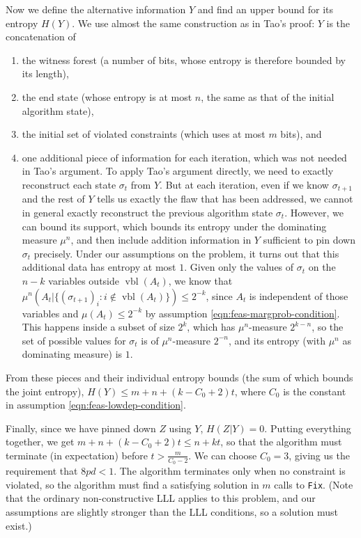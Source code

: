\documentclass[twocolumn]{article}
\begin{document}
Now we define the alternative information $Y$ and find an upper bound for its entropy $H(Y)$.  We use almost the same construction as in Tao's proof: $Y$ is the concatenation of
\begin{enumerate}
  \item the witness forest (a number of bits, whose entropy is therefore bounded by its length),
  \item the end state (whose entropy is at most $n$, the same as that of the initial algorithm state),
  \item the initial set of violated constraints (which uses at most $m$ bits), and
  \item one additional piece of information for each iteration, which was not needed in Tao's argument.  To apply Tao's argument directly, we need to exactly reconstruct each state $\sigma_t$ from $Y$.  But at each iteration, even if we know $\sigma_{t+1}$ and the rest of $Y$ tells us exactly the flaw that has been addressed, we cannot in general exactly reconstruct the previous algorithm state $\sigma_t$.  However, we can bound its support, which bounds its entropy under the dominating measure $\mu^n$, and then include addition information in $Y$ sufficient to pin down $\sigma_t$ precisely.  Under our assumptions on the problem, it turns out that this additional data has entropy at most $1$.  Given only the values of $\sigma_t$ on the $n - k$ variables outside $\operatorname{vbl}(A_t)$, we know that $\mu^n(A_t | \{(\sigma_{t+1})_i: i \notin \operatorname{vbl}(A_t)\}) \leq 2^{-k}$, since $A_t$ is independent of those variables and $\mu(A_t) \leq 2^{-k}$ by assumption \ref{eqn:feas-margprob-condition}.  This happens inside a subset of size $2^{k}$, which has $\mu^n$-measure $2^{k-n}$, so the set of possible values for $\sigma_t$ is of $\mu^n$-measure $2^{-n}$, and its entropy (with $\mu^n$ as dominating measure) is $1$. %
\end{enumerate}

From these pieces and their individual entropy bounds (the sum of which bounds the joint entropy), $H(Y) \leq m + n + (k - C_0 + 2) t$, where $C_0$ is the constant in assumption \ref{eqn:feas-lowdep-condition}.

Finally, since we have pinned down $Z$ using $Y$, $H(Z | Y) = 0$.  Putting everything together, we get $m + n + (k - C_0 + 2) t \leq n + k t$, so that the algorithm must terminate (in expectation) before $t > \frac{m}{C_0 - 2}$.  We can choose $C_0 = 3$, giving us the requirement that $8 p d < 1$.  The algorithm terminates only when no constraint is violated, so the algorithm must find a satisfying solution in $m$ calls to \texttt{Fix}.  (Note that the ordinary non-constructive LLL applies to this problem, and our assumptions are slightly stronger than the LLL conditions, so a solution must exist.)
\end{document}
